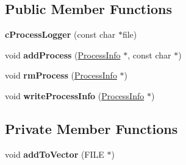 \subsection*{\-Public \-Member \-Functions}
\begin{DoxyCompactItemize}
\item 
\hypertarget{classcProcessLogger_a8f2caeb94909982fc6ef8797a2982cbb}{{\bfseries c\-Process\-Logger} (const char $\ast$file)}\label{db/d63/classcProcessLogger_a8f2caeb94909982fc6ef8797a2982cbb}

\item 
\hypertarget{classcProcessLogger_a883781fda7eb9ad5cbefe11985f17d78}{void {\bfseries add\-Process} (\hyperlink{structProcessInfo}{\-Process\-Info} $\ast$, const char $\ast$)}\label{db/d63/classcProcessLogger_a883781fda7eb9ad5cbefe11985f17d78}

\item 
\hypertarget{classcProcessLogger_a6862947e033148e68e6652923670e4d4}{void {\bfseries rm\-Process} (\hyperlink{structProcessInfo}{\-Process\-Info} $\ast$)}\label{db/d63/classcProcessLogger_a6862947e033148e68e6652923670e4d4}

\item 
\hypertarget{classcProcessLogger_a4ecc32888f86d0933e2ea706b4c60efb}{void {\bfseries write\-Process\-Info} (\hyperlink{structProcessInfo}{\-Process\-Info} $\ast$)}\label{db/d63/classcProcessLogger_a4ecc32888f86d0933e2ea706b4c60efb}

\end{DoxyCompactItemize}
\subsection*{\-Private \-Member \-Functions}
\begin{DoxyCompactItemize}
\item 
\hypertarget{classcProcessLogger_a07a6564b6cad6a08c10bc5aadace6417}{void {\bfseries add\-To\-Vector} (\-F\-I\-L\-E $\ast$)}\label{db/d63/classcProcessLogger_a07a6564b6cad6a08c10bc5aadace6417}

\end{DoxyCompactItemize}
